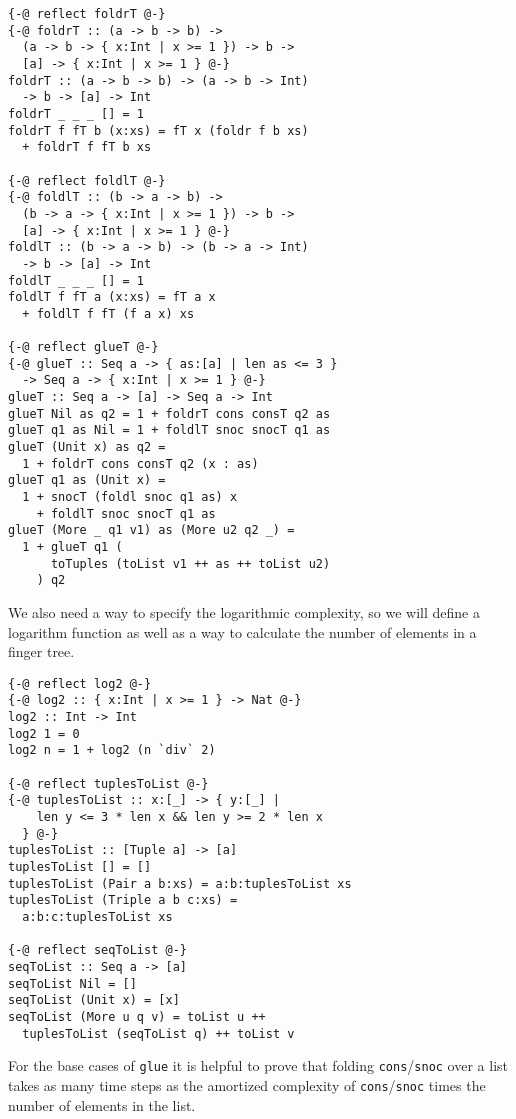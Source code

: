 \documentclass[sigplan,screen]{acmart}
\begin{document}
\begin{lstlisting}
{-@ reflect foldrT @-}
{-@ foldrT :: (a -> b -> b) ->
  (a -> b -> { x:Int | x >= 1 }) -> b ->
  [a] -> { x:Int | x >= 1 } @-}
foldrT :: (a -> b -> b) -> (a -> b -> Int)
  -> b -> [a] -> Int
foldrT _ _ _ [] = 1
foldrT f fT b (x:xs) = fT x (foldr f b xs)
  + foldrT f fT b xs

{-@ reflect foldlT @-}
{-@ foldlT :: (b -> a -> b) ->
  (b -> a -> { x:Int | x >= 1 }) -> b ->
  [a] -> { x:Int | x >= 1 } @-}
foldlT :: (b -> a -> b) -> (b -> a -> Int)
  -> b -> [a] -> Int
foldlT _ _ _ [] = 1
foldlT f fT a (x:xs) = fT a x
  + foldlT f fT (f a x) xs

{-@ reflect glueT @-}
{-@ glueT :: Seq a -> { as:[a] | len as <= 3 }
  -> Seq a -> { x:Int | x >= 1 } @-}
glueT :: Seq a -> [a] -> Seq a -> Int
glueT Nil as q2 = 1 + foldrT cons consT q2 as
glueT q1 as Nil = 1 + foldlT snoc snocT q1 as
glueT (Unit x) as q2 =
  1 + foldrT cons consT q2 (x : as)
glueT q1 as (Unit x) =
  1 + snocT (foldl snoc q1 as) x
    + foldlT snoc snocT q1 as
glueT (More _ q1 v1) as (More u2 q2 _) =
  1 + glueT q1 (
      toTuples (toList v1 ++ as ++ toList u2)
    ) q2
\end{lstlisting}

We also need a way to specify the logarithmic complexity, so we will define a logarithm function as well as a way to calculate the number of elements in a finger tree.

\begin{lstlisting}
{-@ reflect log2 @-}
{-@ log2 :: { x:Int | x >= 1 } -> Nat @-}
log2 :: Int -> Int
log2 1 = 0
log2 n = 1 + log2 (n `div` 2)

{-@ reflect tuplesToList @-}
{-@ tuplesToList :: x:[_] -> { y:[_] |
    len y <= 3 * len x && len y >= 2 * len x
  } @-}
tuplesToList :: [Tuple a] -> [a]
tuplesToList [] = []
tuplesToList (Pair a b:xs) = a:b:tuplesToList xs
tuplesToList (Triple a b c:xs) =
  a:b:c:tuplesToList xs

{-@ reflect seqToList @-}
seqToList :: Seq a -> [a]
seqToList Nil = []
seqToList (Unit x) = [x]
seqToList (More u q v) = toList u ++
  tuplesToList (seqToList q) ++ toList v
\end{lstlisting}

For the base cases of \texttt{glue} it is helpful to prove that folding \texttt{cons}/\texttt{snoc} over a list takes as many time steps as the amortized complexity of \texttt{cons}/\texttt{snoc} times the number of elements in the list.
\end{document}
